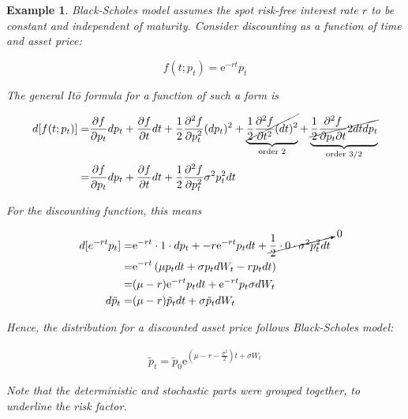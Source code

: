 \documentclass[oneside,titlepage,headinclude,12pt,a4paper,BCOR5mm,footinclude]{book}
\theoremstyle{defn}
\newtheorem{example}{Example}
\newcommand{\eexp}{\mathrm{e}}
\begin{document}
  \begin{example}
    Black-Scholes model assumes the \textit{spot risk-free interest rate} $r$ to
    be constant and independent of  maturity. Consider \textit{discounting} as a
    function of time and asset price:

    \[
      f(t;p_t) = \eexp^{-rt}p_t
    \]

    The general It\=o formula for a function of such a form is

    \begin{align*}
      d[f(t;p_t)] = & 
        \frac{\partial f}{\partial p_t} dp_t + 
        \frac{\partial f}{\partial t} dt + 
        \frac{1}{2} \frac{\partial^2 f}{\partial p_t^2} (dp_t)^2 +
        \underbrace{\cancel{\frac{1}{2} \frac{\partial^2 f}{\partial t^2} (dt)^2}}_\text{order 2} +
        \underbrace{\cancel{\frac{1}{2} \frac{\partial^2 f}{\partial p_t \partial t} 2dtdp_t}}_\text{order 3/2}
        \\
        = & 
        \frac{\partial f}{\partial p_t} dp_t + 
        \frac{\partial f}{\partial t} dt + 
        \frac{1}{2} \frac{\partial^2 f}{\partial p_t^2} \sigma^2 p_t^2dt
    \end{align*}

    For the discounting function, this means

    \begin{align*}
      d[e^{-rt}p_t] = & \eexp^{-rt} \cdot 1 \cdot dp_t + -r\eexp^{-rt}p_tdt +
        \cancelto{0}{\frac{1}{2} \cdot 0 \cdot \sigma^2 p_t^2 dt}
        \\
        = & \eexp^{-rt}\left( \mu p_t dt + \sigma p_t dW_t -r p_t dt \right)
        \\
        = & (\mu - r) \eexp^{-rt} p_tdt + \eexp^{-rt} p_t\sigma dW_t
        \\
      d\tilde{p}_t = & (\mu - r)\tilde{p}_tdt + \sigma \tilde{p}_t dW_t
    \end{align*}

    Hence, the distribution for a discounted asset price follows Black-Scholes model:

    \begin{align*}
      \tilde{p}_t = \tilde{p}_0 \eexp^{(\mu - r - \frac{\sigma^2}{2})t + \sigma W_t}
    \end{align*}

    Note that the  deterministic and stochastic parts were  grouped together, to
    underline the \textit{risk factor}.
  \end{example}
\end{document}
